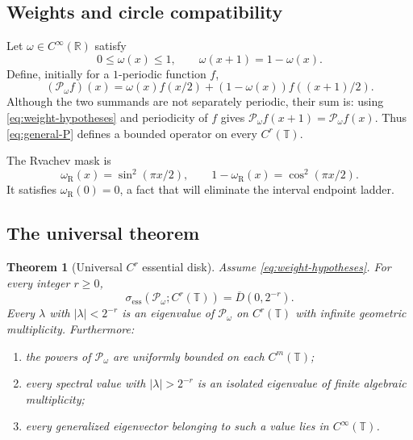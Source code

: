 \documentclass[11pt,a4paper]{article}
\newtheorem{theorem}{Theorem}[section]
\theoremstyle{definition}
\theoremstyle{remark}
\newcommand{\R}{\mathbb R}
\newcommand{\T}{\mathbb T}
\newcommand{\Dbar}[1]{\overline{D}(0,#1)}
\newcommand{\spece}{\sigma_{\mathrm{ess}}}
\newcommand{\Pop}{\mathcal P}
\begin{document}
\subsection{Weights and circle compatibility}
Let $\omega\in C^\infty(\R)$ satisfy
\begin{equation}
 0\le\omega(x)\le1,
 \qquad
 \omega(x+1)=1-\omega(x).
 \label{eq:weight-hypotheses}
\end{equation}
Define, initially for a $1$-periodic function $f$,
\begin{equation}
 (\Pop_\omega f)(x)=\omega(x)f(x/2)
 +(1-\omega(x))f((x+1)/2).
 \label{eq:general-P}
\end{equation}
Although the two summands are not separately periodic, their sum is:
using \eqref{eq:weight-hypotheses} and periodicity of $f$ gives
$\Pop_\omega f(x+1)=\Pop_\omega f(x)$.  Thus \eqref{eq:general-P} defines a
bounded operator on every $C^r(\T)$.

The Rvachev mask is
\begin{equation}
 \omega_\mathrm{R}(x)=\sin^2(\pi x/2),
 \qquad 1-\omega_\mathrm{R}(x)=\cos^2(\pi x/2).
 \label{eq:rvachev-weight}
\end{equation}
It satisfies $\omega_\mathrm{R}(0)=0$, a fact that will eliminate the
interval endpoint ladder.

\subsection{The universal theorem}
\begin{theorem}[Universal $C^r$ essential disk]
\label{thm:universal-disk}
Assume \eqref{eq:weight-hypotheses}.  For every integer $r\ge0$,
\begin{equation}
 \spece(\Pop_\omega;C^r(\T))=\Dbar{2^{-r}}.
 \label{eq:universal-essential}
\end{equation}
Every $\lambda$ with $|\lambda|<2^{-r}$ is an eigenvalue of
$\Pop_\omega$ on $C^r(\T)$ with infinite geometric multiplicity.
Furthermore:
\begin{enumerate}[label=\textup{(\roman*)}]
\item the powers of $\Pop_\omega$ are uniformly bounded on each $C^m(\T)$;
\item every spectral value with $|\lambda|>2^{-r}$ is an isolated eigenvalue
      of finite algebraic multiplicity;
\item every generalized eigenvector belonging to such a value lies in
      $C^\infty(\T)$.
\end{enumerate}
\end{theorem}
\end{document}
